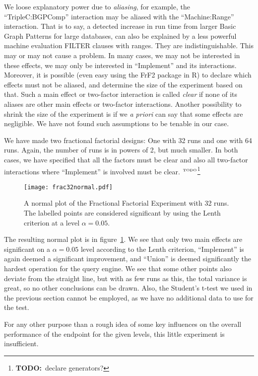\documentclass{article}
\newcommand{\todo}[1]{\ensuremath{^{\textrm{\tiny{TODO}\normalsize}}}\footnote{\textbf{TODO:}~#1}}
\begin{document}
We loose explanatory power due to \emph{aliasing}, for example, the
``TripleC:BGPComp'' interaction may be aliased with the
``Machine:Range'' interaction. That is to say, a detected increase in
run time from larger Basic Graph Patterns for large databases, can
also be explained by a less powerful machine evaluation FILTER clauses
with ranges. They are indistinguishable. This may or may not cause a
problem. In many cases, we may not be interested in these effects, we
may only be interested in ``Implement'' and its
interactions. Moreover, it is possible (even easy using the FrF2
package in R) to declare which effects must not be aliased, and
determine the size of the experiment based on that. Such a main effect
or two-factor interaction is called \emph{clear} if none of its
aliases are other main effects or two-factor interactions. Another
possibility to shrink the size of the experiment is if we \textit{a
  priori} can say that some effects are negligible. We have not found
such assumptions to be tenable in our case.

We have made two fractional factorial designs: One with 32 runs and
one with 64 runs. Again, the number of runs is in powers of 2, but
much smaller. In both cases, we have specified that all the factors
must be clear and also all two-factor interactions where ``Implement''
is involved must be clear. \todo{declare generators?}

\begin{figure}[hb]
  \texttt{[image: frac32normal.pdf]}
  \caption{A normal plot of the Fractional Factorial Experiment with
    32 runs. The labelled points are considered significant by using
    the Lenth criterion at a level
    $\alpha=0.05$.}\label{fig:frac32normal}
\end{figure}


The resulting normal plot is in figure~\ref{fig:frac32normal}. We see that
only two main effects are significant on a $\alpha = 0.05$ level
according to the Lenth criterion, ``Implement'' is again deemed a
significant improvement, and ``Union'' is deemed significantly the
hardest operation for the query engine. We see that some other points
also deviate from the straight line, but with as few runs as this, the
total variance is great, so no other conclusions can be drawn. Also,
the Student's t-test we used in the previous section cannot be
employed, as we have no additional data to use for the test.

For any other purpose than a rough idea of some key influences on the
overall performance of the endpoint for the given levels, this little
experiment is insufficient.
\end{document}
